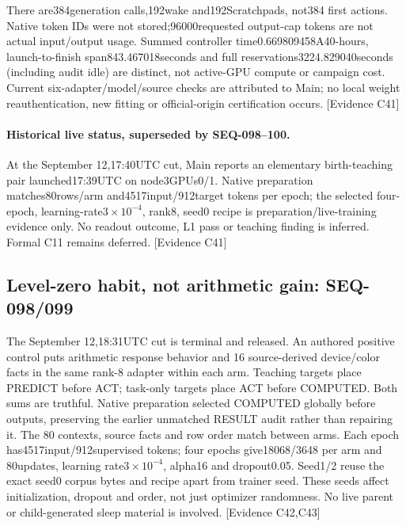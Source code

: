 \documentclass[11pt]{article}
\newcommand{\ev}[1]{\textsf{[Evidence #1]}}
\begin{document}
There are384generation calls,192wake and192Scratchpads, not384 first actions.
Native token IDs were not stored;96000requested output-cap tokens are not
actual input/output usage. Summed controller time0.669809458A40-hours,
launch-to-finish span843.467018seconds and full reservations3224.829040seconds
(including audit idle) are distinct, not active-GPU compute or campaign cost.
Current six-adapter/model/source checks are attributed to Main; no local weight
reauthentication, new fitting or official-origin certification occurs. \ev{C41}

\paragraph{Historical live status, superseded by SEQ-098--100.} At the September 12,17:40UTC cut, Main
reports an elementary birth-teaching pair launched17:39UTC on node3GPUs0/1.
Native preparation matches80rows/arm and4517input/912target tokens per epoch;
the selected four-epoch, learning-rate$3\times10^{-4}$, rank8, seed0 recipe
is preparation/live-training evidence only. No readout outcome, L1 pass or
teaching finding is inferred. Formal C11 remains deferred. \ev{C41}

\subsection{Level-zero habit, not arithmetic gain: SEQ-098/099}
The September 12,18:31UTC cut is terminal and released. An authored positive
control puts arithmetic response behavior and 16 source-derived device/color
facts in the same rank-8 adapter within each arm. Teaching targets place
PREDICT before ACT; task-only targets place ACT before COMPUTED. Both sums
are truthful. Native preparation selected COMPUTED globally before outputs,
preserving the earlier unmatched RESULT audit rather than repairing it.
The 80 contexts, source facts and row order match between arms. Each epoch
has4517input/912supervised tokens; four epochs give18068/3648 per arm and
80updates, learning rate$3\times10^{-4}$, alpha16 and dropout0.05. Seed1/2
reuse the exact seed0 corpus bytes and recipe apart from trainer seed.
These seeds affect initialization, dropout and order, not just optimizer
randomness. No live parent or child-generated sleep material is involved. \ev{C42,C43}
\end{document}
